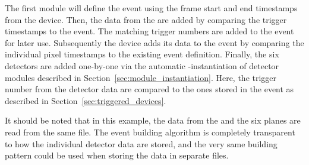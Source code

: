 The first module will define the event using the frame start and end timestamps from the  device.
Then, the data from the  are added by comparing the trigger timestamps to the event.
The matching trigger numbers are added to the event for later use.
Subsequently the  device adds its data to the event by comparing the individual pixel timestamps to the existing event definition.
Finally, the six  detectors are added one-by-one via the automatic -instantiation of detector modules described in Section~\ref{sec:module_instantiation}.
Here, the trigger number from the detector data are compared to the ones stored in the event as described in Section~\ref{sec:triggered_devices}.

It should be noted that in this example, the data from the  and the six  planes are read from the same file.
The event building algorithm is completely transparent to how the individual detector data are stored, and the very same building pattern could be used when storing the data in separate files.

